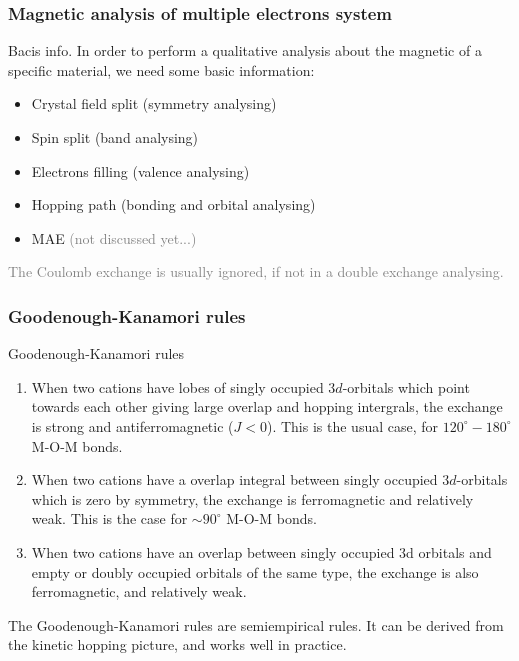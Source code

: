 \documentclass{beamer}
\begin{document}
  \begin{frame}
    \frametitle{Magnetic analysis of multiple electrons system}
    \begin{block}{Bacis info.}
      In order to perform a qualitative analysis about the magnetic of a specific material, we need some basic information:
      \begin{itemize}
        \item Crystal field split (symmetry analysing)
        \item Spin split (band analysing)
        \item Electrons filling (valence analysing)
        \item Hopping path (bonding and orbital analysing)
        \item MAE \textcolor{gray}{(not discussed yet...)}
      \end{itemize}
    \end{block}
    \textcolor{gray}{The Coulomb exchange is usually ignored, if not in a double exchange analysing.}
  \end{frame}

  \begin{frame}
    \frametitle{Goodenough-Kanamori rules}
    \begin{block}{Goodenough-Kanamori rules}
      \begin{enumerate}
      \item When two cations have lobes of singly occupied \(3d\)-orbitals which point towards each other giving large overlap and hopping intergrals, the exchange is strong and antiferromagnetic (\(J<0\)). This is the usual case, for \(120^{\circ}-180^{\circ}\) M-O-M bonds.

      \item When two cations have a overlap integral between singly occupied \(3d\)-orbitals which is zero by symmetry, the exchange is ferromagnetic and relatively	weak. This is the case for \(\sim 90^{\circ}\) M-O-M bonds.

      \item When two cations have an overlap between singly occupied 3d orbitals and empty or doubly occupied orbitals of the same type, the exchange is also ferromagnetic, and relatively weak.
      \end{enumerate}
    \end{block}
    The Goodenough-Kanamori rules are semiempirical rules. It can be derived from the kinetic hopping picture, and works well in practice.
  \end{frame}
\end{document}
